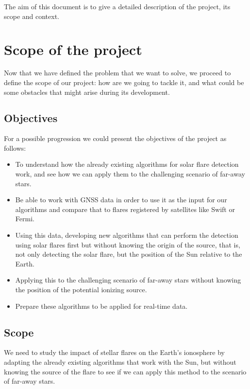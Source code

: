 The aim of this document is to give a detailed description of the project, its scope and context.\\


\newpage
\section{Scope of the project}

Now that we have defined the problem that we want to solve, we proceed to define the scope of our project: how are we going to tackle it, and what could be some obstacles that might arise during its development.

\subsection{Objectives}

For a possible progression we could present the objectives of the project as follows:

\begin{itemize}
  \item To understand how the already existing algorithms for solar flare detection work, and see how we can apply them to the challenging scenario of far-away stars.
  \item Be able to work with GNSS data in order to use it as the input for our algorithms and compare that to flares registered by satellites like Swift or Fermi.
  \item Using this data, developing new algorithms that can perform the detection using solar flares first but without knowing the origin of the source, that is, not only detecting the solar flare, but the position of the Sun relative to the Earth.
  \item Applying this to the challenging scenario of far-away stars without knowing the position of the potential ionizing source.
  \item Prepare these algorithms to be applied for real-time data.
\end{itemize}

\subsection{Scope}

We need to study the impact of stellar flares on the Earth’s ionosphere by adapting the already existing algorithms that work with the Sun, but without knowing the source of the flare to see if we can apply this method to the scenario of far-away stars.\\

